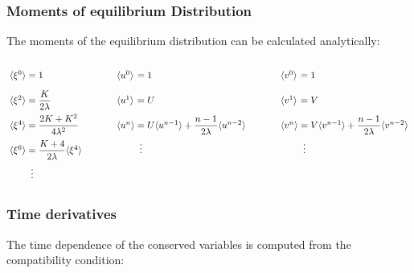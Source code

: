 \documentclass[
	pdftex,             %
	12pt,				%
	a4paper,		   	%
	english,				%
	oneside,			%
]{article}
\newcommand{\mom}[1]{\langle #1 \rangle}
\begin{document}
\subsubsection{Moments of equilibrium Distribution}

The moments of the equilibrium distribution can be calculated analytically:

\begin{equation}
\arraycolsep=1.4pt\def\arraystretch{2.2}
\begin{array}{lllll}
    \begin{array}{lcl}
        \mom{\xi^0} &=& 1 \\
        \mom{\xi^2} &=& \dfrac{K}{2 \lambda} \\
        \mom{\xi^4} &=& \dfrac{2K + K^2}{4\lambda^2} \\
        \mom{\xi^6} &=& \dfrac{K+4}{2 \lambda} \mom{\xi^4} \\
        ~&\vdots&~
    \end{array}
    &\hspace{1cm}&
    \begin{array}{lcl}
        \mom{u^0} &=& 1 \\
        \mom{u^1} &=& U \\
        \mom{u^n} &=& U \mom{u^{n-1}} + \dfrac{n-1}{2 \lambda} \mom{u^{n-2}} \\
        ~&\vdots&~ \\
        ~&~&~
    \end{array}
    &\hspace{1cm}&
    \begin{array}{lcl}
        \mom{v^0} &=& 1 \\
        \mom{v^1} &=& V \\
        \mom{v^n} &=& V \mom{v^{n-1}} + \dfrac{n-1}{2 \lambda} \mom{v^{n-2}} \\
        ~&\vdots&~ \\
        ~&~&~
    \end{array}
\end{array}
\end{equation}

\subsubsection{Time derivatives}

The time dependence of the conserved variables is computed from the compatibility condition:
\end{document}

